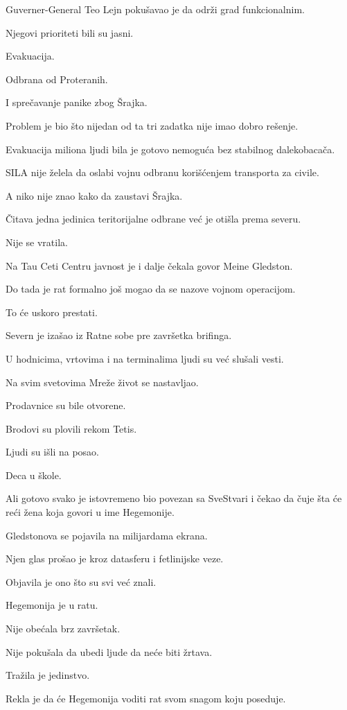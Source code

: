 Guverner-General Teo Lejn pokušavao je da održi grad funkcionalnim.

Njegovi prioriteti bili su jasni.

Evakuacija.

Odbrana od Proteranih.

I sprečavanje panike zbog Šrajka.

Problem je bio što nijedan od ta tri zadatka nije imao dobro rešenje.

Evakuacija miliona ljudi bila je gotovo nemoguća bez stabilnog dalekobacača.

SILA nije želela da oslabi vojnu odbranu korišćenjem transporta za civile.

A niko nije znao kako da zaustavi Šrajka.

Čitava jedna jedinica teritorijalne odbrane već je otišla prema severu.

Nije se vratila.

\bigskip

Na Tau Ceti Centru javnost je i dalje čekala govor Meine Gledston.

Do tada je rat formalno još mogao da se nazove vojnom operacijom.

To će uskoro prestati.

Severn je izašao iz Ratne sobe pre završetka brifinga.

U hodnicima, vrtovima i na terminalima ljudi su već slušali vesti.

Na svim svetovima Mreže život se nastavljao.

Prodavnice su bile otvorene.

Brodovi su plovili rekom Tetis.

Ljudi su išli na posao.

Deca u škole.

Ali gotovo svako je istovremeno bio povezan sa SveStvari i čekao da čuje šta će reći žena koja govori u ime Hegemonije.

Gledstonova se pojavila na milijardama ekrana.

Njen glas prošao je kroz datasferu i fetlinijske veze.

Objavila je ono što su svi već znali.

Hegemonija je u ratu.

Nije obećala brz završetak.

Nije pokušala da ubedi ljude da neće biti žrtava.

Tražila je jedinstvo.

Rekla je da će Hegemonija voditi rat svom snagom koju poseduje.

